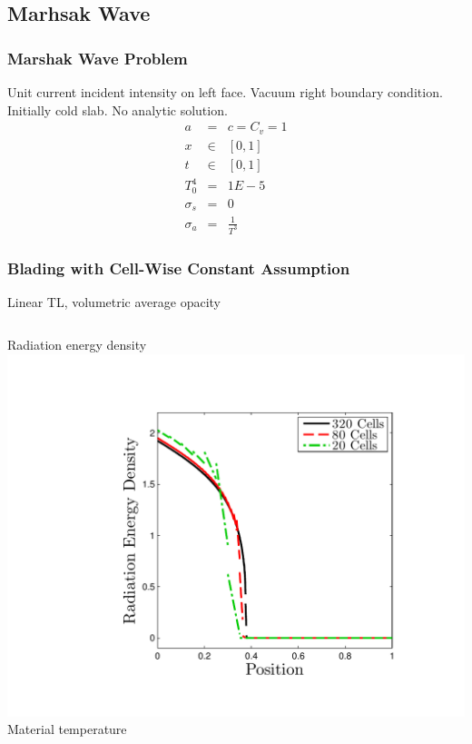 \documentclass{beamer}
\newcommand{\bea}{\begin{eqnarray*}}  %
\newcommand{\eea}{\end{eqnarray*}}
\begin{document}
\subsection{Marhsak Wave}
\begin{frame}
\frametitle{Marshak Wave Problem}
Unit current incident intensity on left face.  Vacuum right boundary condition.  Initially cold slab.  No analytic solution.
\bea
a&=&c=C_v = 1 \\
x&\in&[0,1] \\
t&\in&[0,1]  \\
T_0^4& =& 1E-5 \\
\sigma_s &=& 0 \\
\sigma_a &=& \frac{1}{T^3}
\eea
\end{frame}

\begin{frame}
\frametitle{Blading with Cell-Wise Constant Assumption}
Linear TL, volumetric average opacity
\begin{columns}[t]
\centering
Radiation energy density
\includegraphics[width=\textwidth,trim=1.2in  0.2in 0.75in 0.5in,clip=true]{../chapter6_grey_radtran/Dissertation_Data/Reorder_Blading_Radiation_Full_MultiCell.pdf}
\centering
Material temperature

\end{columns}
\end{frame}
\end{document}
